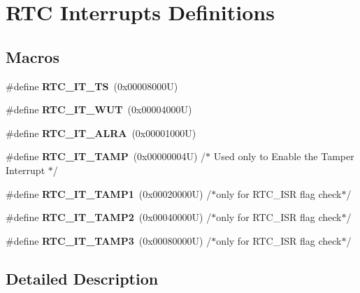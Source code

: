 \hypertarget{group___r_t_c___interrupts___definitions}{}\section{R\+TC Interrupts Definitions}
\label{group___r_t_c___interrupts___definitions}
\subsection*{Macros}
\begin{DoxyCompactItemize}
\item 
\mbox{\label{group___r_t_c___interrupts___definitions_ga2c4632667c515e366a79df6341d5f3d1}} 
\#define {\bfseries R\+T\+C\+\_\+\+I\+T\+\_\+\+TS}~(0x00008000\+U)
\item 
\mbox{\label{group___r_t_c___interrupts___definitions_gadc90686ace99992f4775c0198a1c6591}} 
\#define {\bfseries R\+T\+C\+\_\+\+I\+T\+\_\+\+W\+UT}~(0x00004000\+U)
\item 
\mbox{\label{group___r_t_c___interrupts___definitions_ga0ba352559e4eb6a5430e1254851a0dfb}} 
\#define {\bfseries R\+T\+C\+\_\+\+I\+T\+\_\+\+A\+L\+RA}~(0x00001000\+U)
\item 
\mbox{\label{group___r_t_c___interrupts___definitions_gada511402e0227932824cdc95711ebd55}} 
\#define {\bfseries R\+T\+C\+\_\+\+I\+T\+\_\+\+T\+A\+MP}~(0x00000004\+U) /$\ast$ Used only to Enable the Tamper Interrupt $\ast$/
\item 
\mbox{\label{group___r_t_c___interrupts___definitions_gaae1bc95e46b6951e45c4d857a6701a8a}} 
\#define {\bfseries R\+T\+C\+\_\+\+I\+T\+\_\+\+T\+A\+M\+P1}~(0x00020000\+U) /$\ast$only for R\+T\+C\+\_\+\+I\+S\+R flag check$\ast$/
\item 
\mbox{\label{group___r_t_c___interrupts___definitions_ga0d3023d6f144f75848c246a033a01485}} 
\#define {\bfseries R\+T\+C\+\_\+\+I\+T\+\_\+\+T\+A\+M\+P2}~(0x00040000\+U) /$\ast$only for R\+T\+C\+\_\+\+I\+S\+R flag check$\ast$/
\item 
\mbox{\label{group___r_t_c___interrupts___definitions_gacdc42256a092ecb2e72e152ff7e4bcfd}} 
\#define {\bfseries R\+T\+C\+\_\+\+I\+T\+\_\+\+T\+A\+M\+P3}~(0x00080000\+U) /$\ast$only for R\+T\+C\+\_\+\+I\+S\+R flag check$\ast$/
\end{DoxyCompactItemize}


\subsection{Detailed Description}
